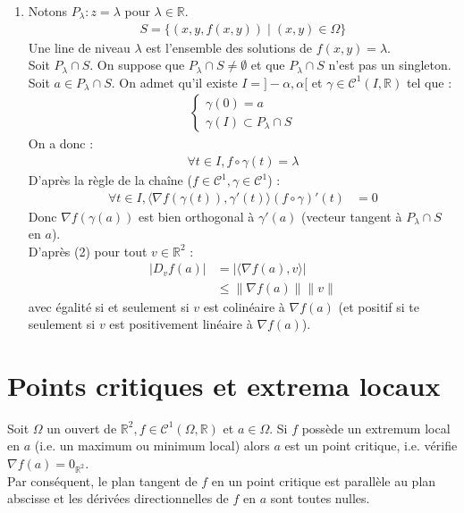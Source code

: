 \documentclass[../main.tex]{subfiles}
\begin{document}
\begin{enumerate}
    \item Notons $P_\lambda: z = \lambda$ pour $\lambda \in \mathbb{R}$. 
    \begin{align*}
        S = \{ (x, y, f(x, y)) \mid (x, y)\in \Omega \}
    \end{align*}
    Une line de niveau $\lambda$ est l'ensemble des solutions de $f(x, y) = \lambda$. \\
    Soit $P_\lambda\cap S$. On suppose que $P_\lambda\cap S \neq \emptyset$ et que $P_\lambda\cap S$ n'est pas un singleton. \\
    Soit $a\in P_\lambda\cap S$. On admet qu'il existe $I = ]-\alpha, \alpha[$ et $\gamma\in \mathcal{C}^1(I, \mathbb{R})$ tel que :
    \begin{align*}
        \begin{cases}
            \gamma(0) = a \\
            \gamma(I) \subset P_\lambda\cap S
        \end{cases}
    \end{align*}
    On a donc : 
    \begin{align*}
        \forall t\in I, f\circ \gamma(t) = \lambda
    \end{align*}
    D'après la règle de la chaîne ($f\in \mathcal{C}^1, \gamma\in \mathcal{C}^1$) : 
    \begin{align*}
        \forall t\in I, \langle \nabla f(\gamma(t)), \gamma'(t)\rangle (f\circ \gamma)'(t) &= 0
    \end{align*}
    Donc $\nabla f(\gamma(a))$ est bien orthogonal à $\gamma'(a)$ (vecteur tangent à $P_\lambda\cap S$ en $a$). \\
    D'après (2) pour tout $v\in \mathbb{R}^2$ : 
    \begin{align*}
        |D_v f(a)| &= |\langle \nabla f(a), v\rangle| \\
        &\leq \| \nabla f(a) \| \|v\|
    \end{align*}
    avec égalité si et seulement si $v$ est colinéaire à $\nabla f(a)$ (et positif si te seulement si $v$ est positivement linéaire à $\nabla f(a)$). 
\end{enumerate}

\section{Points critiques et extrema locaux}
\begin{tcolorbox}[title=Théorème 36.51, title filled=false, colframe=orange, colback=orange!10!white]
    Soit $\Omega$ un ouvert de $\mathbb{R}^2, f \in \mathcal{C}^1(\Omega, \mathbb{R})$ et $a \in \Omega$. Si $f$ possède un extremum local en $a$ (i.e. un maximum ou minimum local) alors $a$ est un point critique, i.e. vérifie $\nabla f(a)=0_{\mathbb{R}^2}$. \\
    Par conséquent, le plan tangent de $f$ en un point critique est parallèle au plan abscisse et les dérivées directionnelles de $f$ en $a$ sont toutes nulles.
\end{tcolorbox}
\end{document}
